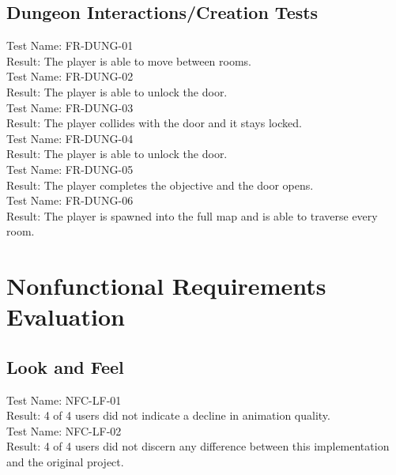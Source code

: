 \documentclass[12pt, titlepage]{article}
\begin{document}
\subsection{Dungeon Interactions/Creation Tests}

Test Name: FR-DUNG-01\\

Result: The player is able to move between rooms.\\

Test Name: FR-DUNG-02\\

Result: The player is able to unlock the door.\\

Test Name: FR-DUNG-03\\

Result: The player collides with the door and it stays locked.\\

Test Name: FR-DUNG-04\\

Result: The player is able to unlock the door.\\

Test Name: FR-DUNG-05\\

Result: The player completes the objective and the door opens.\\

Test Name: FR-DUNG-06\\

Result: The player is spawned into the full map and is able to traverse every room.\\

\section{Nonfunctional Requirements Evaluation}

\subsection{Look and Feel}

Test Name: NFC-LF-01\\

Result: 4 of 4 users did not indicate a decline in animation quality.\\

Test Name: NFC-LF-02\\

Result: 4 of 4 users did not discern any difference between this implementation and the original project.\\
\end{document}

